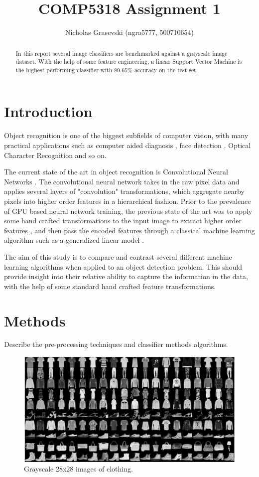 \documentclass[landscape,twocolumn]{article}
\title{COMP5318 Assignment 1}
\author{Nicholas Grasevski (ngra5777, 500710654)}
\begin{document}
\maketitle
\begin{abstract}
In this report several image classifiers are benchmarked against a grayscale image dataset. With the help of some feature engineering, a linear Support Vector Machine is the highest performing classifier with 89.65\% accuracy on the test set.
\end{abstract}

\section{Introduction}
Object recognition is one of the biggest subfields of computer vision, with many practical applications such as computer aided diagnosis \cite{doi2007computer}, face detection \cite{hjelmaas2001face}, Optical Character Recognition \cite{mori1999optical} and so on.

The current state of the art in object recognition is Convolutional Neural Networks \cite{iandola2016squeezenet}. The convolutional neural network takes in the raw pixel data and applies several layers of "convolution" transformations, which aggregate nearby pixels into higher order features in a hierarchical fashion. Prior to the prevalence of GPU based neural network training, the previous state of the art was to apply some hand crafted transformations to the input image to extract higher order features \cite{rybski2010visual}, and then pass the encoded features through a classical machine learning algorithm such as a generalized linear model \cite{ebrahimzadeh2014efficient}.

The aim of this study is to compare and contrast several different machine learning algorithms when applied to an object detection problem. This should provide insight into their relative ability to capture the information in the data, with the help of some standard hand crafted feature transformations.

\section{Methods}
Describe the pre-processing techniques and classifier methods algorithms.

\begin{figure}[ht]
\includegraphics[width=\linewidth]{../Dataset_image}
\caption{Grayscale 28x28 images of clothing.}
\label{fig:images}
\end{figure}
\end{document}
